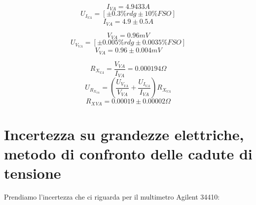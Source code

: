 \documentclass[a4paper]{article}
\begin{document}
\begin{Large}
	\begin{equation}
		I_{VA}= 4.9433 A
	\end{equation}
	\begin{equation}
		U_{I_{VA}} = [\pm 0.3\%rdg \pm 10\% FSO]
	 \end{equation}
	 \begin{equation}
		I_{VA} = 4.9 \pm 0.5 A
	 \end{equation}
\end{Large}

\begin{Large}
	\begin{equation}
		V_{VA}= 0.96 mV
	\end{equation}
	\begin{equation}
		U_{V_{VA}} = [\pm 0.005\%rdg \pm 0.0035\% FSO]
	 \end{equation}
	 \begin{equation}
		V_{VA} = 0.96 \pm 0.004 mV
	 \end{equation}
\end{Large}

\begin{Large}
	\begin{equation}
		R_{X_{VA}}= \frac{V_{VA}}{I_{VA}} =0.000194 \Omega
	\end{equation}
	\begin{equation}
		U_{R_{X_{VA}}} = (\frac{U_{V_{VA}}}{V_{VA}}+\frac{U_{I_{VA}}}{I_{VA}})R_{X_{VA}}
	 \end{equation}
	 \begin{equation}
		R_X{_{VA}} = 0.00019\pm 0.00002\Omega
	 \end{equation}
\end{Large}

\section {Incertezza su grandezze elettriche, metodo di confronto delle cadute di tensione}

Prendiamo l'incertezza che ci riguarda per il multimetro Agilent 34410:
\end{document}
